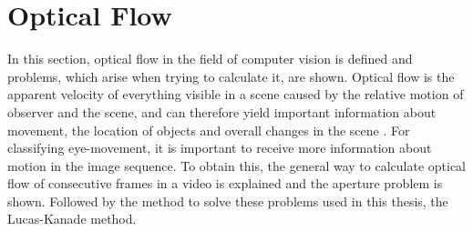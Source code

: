 \documentclass[Bachelorarbeit.tex]{subfiles}
\begin{document}
\newpage
\section{Optical Flow}
\label{Optical Flow}
In this section, optical flow in the field of computer vision is defined and problems, which arise when trying to calculate it, are shown. Optical flow is the apparent velocity of everything visible in a scene caused by the relative motion of observer and the scene, and can therefore yield important information about movement, the location of objects and overall changes in the scene \citep[p. 185]{horn1981determining}. For classifying eye-movement, it is important to receive more information about motion in the image sequence.
To obtain this, the general way to calculate optical flow of consecutive frames in a video is explained and the aperture problem is shown. Followed by the method to solve these problems used in this thesis, the Lucas-Kanade method. 
\end{document}
